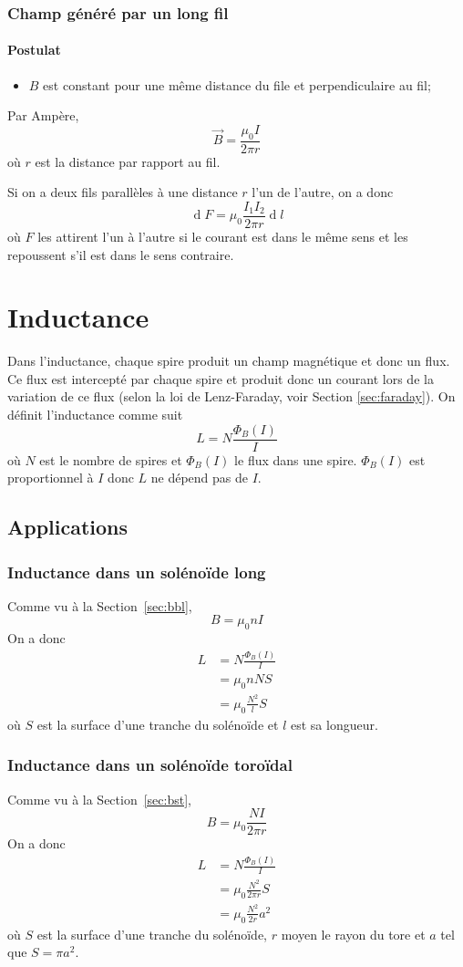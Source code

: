 \documentclass[11pt,a4paper]{article}
\newcommand{\B}{\vec B}
\DeclareMathOperator{\diff}{d}
\newcommand{\dif}{\diff\!}
\begin{document}
\subsubsection{Champ généré par un long fil}
\paragraph{Postulat}
\begin{itemize}
	\item $B$ est constant pour une même distance du file et perpendiculaire au fil;
\end{itemize}
Par Ampère,
\[ \B = \frac{\mu_0I}{2\pi r} \]
où $r$ est la distance par rapport au fil.

Si on a deux fils parallèles à une distance $r$ l'un de l'autre, on a donc
\[ \dif F = \mu_0\frac{I_1I_2}{2\pi r}\dif l \]
où $F$ les attirent l'un à l'autre si le courant est dans le même sens et les repoussent s'il est dans le sens contraire.

\section{Inductance}
Dans l'inductance, chaque spire produit un champ magnétique et donc un flux.
Ce flux est intercepté par chaque spire et produit donc un courant lors de la variation de ce flux (selon la loi de Lenz-Faraday, voir Section \ref{sec:faraday}).
On définit l'inductance comme suit
\[ L = N\frac{\Phi_B(I)}{I} \]
où $N$ est le nombre de spires et $\Phi_B(I)$ le flux dans une spire.
$\Phi_B(I)$ est proportionnel à $I$ donc $L$ ne dépend pas de $I$.

\subsection{Applications}
\subsubsection{Inductance dans un solénoïde long}
Comme vu à la Section~\ref{sec:bbl},
\[ B = \mu_0nI \]
On a donc
\begin{align*}
	L &= N\frac{\Phi_B(I)}{I}\\
	&= \mu_0 nNS\\
	&= \mu_0 \frac{N^2}{l}S
\end{align*}
où $S$ est la surface d'une tranche du solénoïde et $l$ est sa longueur.

\subsubsection{Inductance dans un solénoïde toroïdal}
Comme vu à la Section~\ref{sec:bst},
\[ B = \mu_0\frac{NI}{2\pi r} \]
On a donc
\begin{align*}
	L &= N\frac{\Phi_B(I)}{I}\\
	&= \mu_0 \frac{N^2}{2\pi r}S\\
	&= \mu_0 \frac{N^2}{2r}a^2
\end{align*}
où $S$ est la surface d'une tranche du solénoïde, $r$ moyen le rayon du tore et $a$ tel que $S = \pi a^2$.
\end{document}
